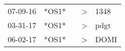 \begin{supertabular}{p{0.07\textwidth}p{0.06\textwidth}p{0.02\textwidth}p{0.02\textwidth}p{0.06\textwidth}}
 07-09-16\textsuperscript{} &  *OS1* &   &  \textgreater &  1348\textsuperscript{} \\
 03-31-17\textsuperscript{} &  *OS1* &   &  \textgreater &  pdgt\textsuperscript{} \\
 06-02-17\textsuperscript{} &  *OS1* &   &  \textgreater &  DOMI\textsuperscript{} \\
\end{supertabular}
